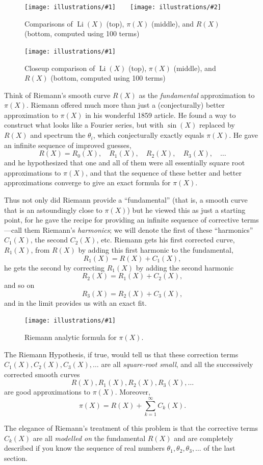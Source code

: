 \documentclass[openany]{book}
\DeclareMathOperator{\Li}{Li}
\newcommand{\ill}[3]{%
   \begin{figure}[H]%
   \vspace{-2ex}
   \centering%
   \texttt{[image: illustrations/\#1]}%
   \caption{#3}%
   \vspace{-2ex}
    \end{figure}}
\newcommand{\illtwo}[4]{%
   \begin{figure}[H]\centering%
   \texttt{[image: illustrations/\#1]}$\qquad$\texttt{[image: illustrations/\#2]}%
   \caption{#4}%
    \end{figure}}
\theoremstyle{plain}
\theoremstyle{definition}
\newcommand{\RH}{Riemann Hypothesis\index{Riemann Hypothesis}}
\begin{document}
\illtwo{pi_riemann_gauss_100}{pi_riemann_gauss_1000}{0.47}{Comparisons of $\Li(X)$ (top), $\pi(X)$ (middle), and $R(X)$ (bottom, computed using 100 terms)\label{fig:guess100}}


\ill{pi_riemann_gauss_10000-11000}{0.5}{Closeup comparison of  $\Li(X)$ (top), $\pi(X)$ (middle), and $R(X)$ (bottom, computed using 100 terms)\label{fig:guess10000}}


Think of Riemann's smooth curve $R(X)$ as the {\em fundamental}
approximation to $\pi(X)$.
Riemann offered much more than just a (conjecturally) better
approximation to $\pi(X)$ in his wonderful 1859 article.
He found a way to construct what looks like a Fourier series,
but with $\sin(X)$ replaced by $R(X)$ and spectrum the $\theta_i$, which
conjecturally exactly equals $\pi(X)$.
He gave an infinite sequence of improved guesses,
$$
R(X) = R_0(X),\quad R_1(X), \quad R_2(X), \quad R_3(X), \quad \ldots
$$
and he hypothesized that one and all of them were all
essentially square root approximations to $\pi(X)$,
and that the sequence of these better and better approximations converge to give an exact formula
for $\pi(X)$.

Thus not only did Riemann provide a ``fundamental'' (that is, a smooth curve
that is an astoundingly close to $\pi(X)$) but he viewed this as just a
starting point, for he gave the recipe for providing an infinite
sequence of corrective terms---call them Riemann's {\em harmonics}; we
will denote the first of these ``harmonics'' $C_1(X)$, the second
$C_2(X)$, etc.  Riemann gets his first corrected curve, $R_1(X)$, from
$R(X)$ by adding this first harmonic to the fundamental, $$R_1(X) =
R(X) + C_1(X),$$ he gets the second by correcting $R_1(X)$ by adding
the second harmonic $$R_2(X) = R_1 (X) + C_2(X),$$ and so on $$R_3(X)
= R_2 (X) + C_3(X),$$ and in the limit provides us with an exact fit.

\ill{riemann_Rk}{0.8}{Riemann analytic formula for $\pi(X)$.}

The \RH{}, if true, would tell us that these correction
terms $C_1(X), C_2(X), C_3(X),\dots$ are all {\em square-root small},
and all the successively corrected smooth curves $$R(X), R_1(X),
R_2(X),R_3(X),\dots$$ are good approximations to $\pi(X)$.
Moreover,
$$
 \pi(X) = R(X) + \sum_{k=1}^{\infty} C_k(X).
$$

The elegance of Riemann's treatment of this problem is that the
corrective terms $C_k(X)$ are all {\em modelled on} the fundamental
$R(X)$ and are completely described if you know the sequence of real
numbers $\theta_1, \theta_2, \theta_3,\dots$ of the last section.
\end{document}
